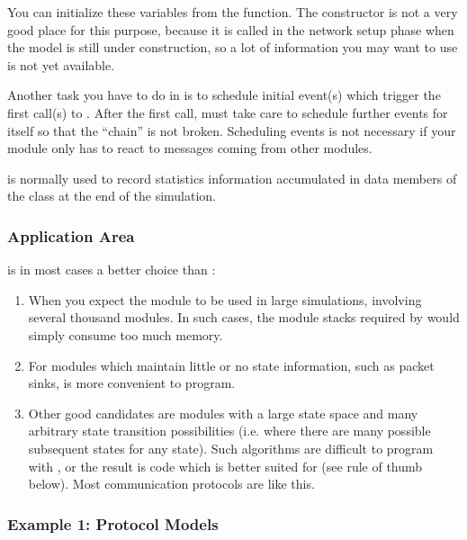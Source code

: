 You can initialize these variables from the 
function.  The constructor is not a very good place
for this purpose, because it is called in the network setup phase when
the model is still under construction, so a lot of information you may
want to use is not yet available.

Another task you have to do in  is to schedule
initial event(s) which trigger the first call(s)
to .  After the first call,
 must take care to schedule further events for
itself so that the ``chain'' is not broken. Scheduling events is not
necessary if your module only has to react to messages coming from
other modules.

 is normally used to record statistics information
accumulated in data members of the class at the end of the simulation.


\subsubsection{Application Area}


 is in most cases a better choice than :

\begin{enumerate}
  \item{When you expect the module to be used in large simulations,
      involving several thousand modules. In such cases, the module stacks
      required by  would simply consume too much memory.}
  \item{For modules which maintain little or no state information,
      such as packet sinks,  is more convenient to program.}
  \item{Other good candidates are modules with a large state space and
      many arbitrary state transition possibilities (i.e. where there
      are many possible subsequent states for any state). Such algorithms
      are difficult to program with , or the result is code
      which is better suited for  (see rule of thumb
      below). Most communication protocols are like this.}
\end{enumerate}


\subsubsection{Example 1: Protocol Models}

